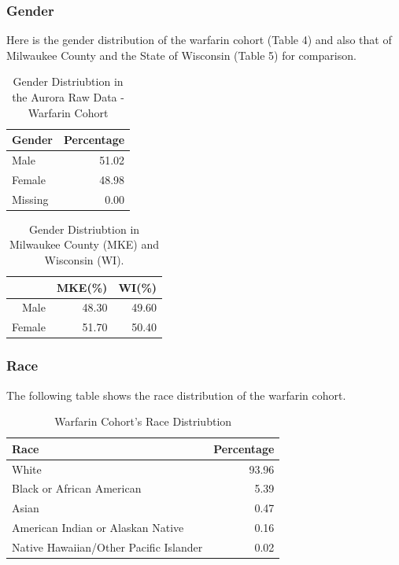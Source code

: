 \documentclass{article}
\begin{document}
\subsubsection{Gender}


Here is the gender distribution of the warfarin cohort (Table 4) and also that of Milwaukee County and the State of Wisconsin (Table 5) for comparison. 

\begin{table}[ht]
\centering
\begin{tabular}{lr}
  \hline
Gender & Percentage \\ 
  \hline
Male & 51.02 \\ 
  Female & 48.98 \\ 
  Missing & 0.00 \\ 
   \hline
\end{tabular}
\caption{Gender Distriubtion in the Aurora Raw Data - Warfarin Cohort} 
\label{Table:1}
\end{table}%
\begin{table}[ht]
\centering
\begin{tabular}{rrr}
  \hline
 & MKE(\%) & WI(\%) \\ 
  \hline
Male & 48.30 & 49.60 \\ 
  Female & 51.70 & 50.40 \\ 
   \hline
\end{tabular}
\caption{Gender Distriubtion in Milwaukee County (MKE) and Wisconsin (WI).} 
\label{Table:1}
\end{table}%
\subsubsection{Race}
The following table shows the race distribution of the warfarin cohort.

\begin{table}[ht]
\centering
\begin{tabular}{lr}
  \hline
Race & Percentage \\ 
  \hline
White & 93.96 \\ 
  Black or African American & 5.39 \\ 
  Asian & 0.47 \\ 
  American Indian or Alaskan Native & 0.16 \\ 
  Native Hawaiian/Other Pacific Islander & 0.02 \\ 
   \hline
\end{tabular}
\caption{Warfarin Cohort's Race Distriubtion} 
\label{Table:3}
\end{table}\newpage
\end{document}
